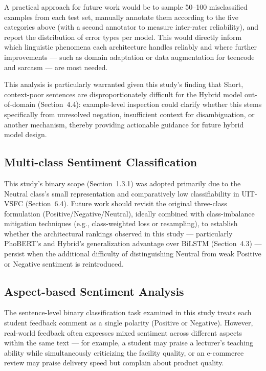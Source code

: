 \documentclass[12pt]{report} %
\begin{document}
A practical approach for future work would be to sample 50--100 misclassified examples from each test set, manually annotate them according to the five categories above (with a second annotator to measure inter-rater reliability), and report the distribution of error types per model. This would directly inform which linguistic phenomena each architecture handles reliably and where further improvements --- such as domain adaptation or data augmentation for teencode and sarcasm --- are most needed.

This analysis is particularly warranted given this study's finding that Short, context-poor sentences are disproportionately difficult for the Hybrid model out-of-domain (Section~4.4): example-level inspection could clarify whether this stems specifically from unresolved negation, insufficient context for disambiguation, or another mechanism, thereby providing actionable guidance for future hybrid model design.

\subsection{Multi-class Sentiment Classification}
This study's binary scope (Section~1.3.1) was adopted primarily due to the Neutral class's small representation and comparatively low classifiability in UIT-VSFC (Section~6.4). Future work should revisit the original three-class formulation (Positive/Negative/Neutral), ideally combined with class-imbalance mitigation techniques (e.g., class-weighted loss or resampling), to establish whether the architectural rankings observed in this study --- particularly PhoBERT's and Hybrid's generalization advantage over BiLSTM (Section~4.3) --- persist when the additional difficulty of distinguishing Neutral from weak Positive or Negative sentiment is reintroduced.

\subsection{Aspect-based Sentiment Analysis}

The sentence-level binary classification task examined in this study treats each student feedback comment as a single polarity (Positive or Negative). However, real-world feedback often expresses mixed sentiment across different aspects within the same text --- for example, a student may praise a lecturer's teaching ability while simultaneously criticizing the facility quality, or an e-commerce review may praise delivery speed but complain about product quality.
\end{document}
